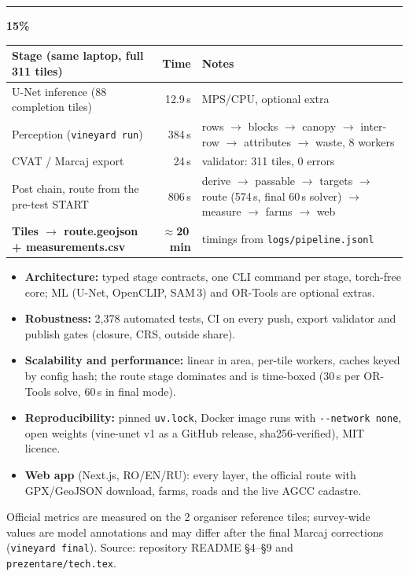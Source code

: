 \documentclass[10pt,a4paper]{article}
\newcommand{\crit}[3]{%
  \par\vspace{7pt}%
  {\color{#1}\rule[-2pt]{6pt}{12pt}}\hspace{5pt}{\large\bfseries\color{night}#2}\hfill{\bfseries\color{#1}#3}\par
  \vspace{-2pt}{\color{#1}\rule{\linewidth}{0.8pt}}\par\vspace{2pt}}
\begin{document}
\crit{cEng}{Engineering}{15\%}
{\small
\begin{tabularx}{\linewidth}{@{}l r Y@{}}
  \toprule
  \textbf{Stage (same laptop, full 311 tiles)} & \textbf{Time} & \textbf{Notes} \\
  \midrule
  U-Net inference (88 completion tiles) & 12.9\,s & MPS/CPU, optional extra \\
  Perception (\texttt{vineyard run}) & 384\,s & rows $\rightarrow$ blocks $\rightarrow$ canopy $\rightarrow$ inter-row $\rightarrow$ attributes $\rightarrow$ waste, 8 workers \\
  CVAT / Marcaj export & 24\,s & validator: 311 tiles, 0 errors \\
  Post chain, route from the pre-test START & 806\,s & derive $\rightarrow$ passable $\rightarrow$ targets $\rightarrow$ route (574\,s, final 60\,s solver) $\rightarrow$ measure $\rightarrow$ farms $\rightarrow$ web \\
  \midrule
  \textbf{Tiles $\rightarrow$ route.geojson + measurements.csv} & \textbf{$\approx$20\,min} & timings from \texttt{logs/pipeline.jsonl} \\
  \bottomrule
\end{tabularx}}
\par\vspace{3pt}
{\small
\begin{itemize}
  \item \textbf{Architecture:} typed stage contracts, one CLI command per stage, torch-free core; ML (U-Net, OpenCLIP, SAM\,3) and OR-Tools are optional extras.
  \item \textbf{Robustness:} 2,378 automated tests, CI on every push, export validator and publish gates (closure, CRS, outside share).
  \item \textbf{Scalability and performance:} linear in area, per-tile workers, caches keyed by config hash; the route stage dominates and is time-boxed (30\,s per OR-Tools solve, 60\,s in final mode).
  \item \textbf{Reproducibility:} pinned \texttt{uv.lock}, Docker image runs with \texttt{-{}-network none}, open weights (vine-unet v1 as a GitHub release, sha256-verified), MIT licence.
  \item \textbf{Web app} (Next.js, RO/EN/RU): every layer, the official route with GPX/GeoJSON download, farms, roads and the live AGCC cadastre.
\end{itemize}}

\vfill
{\scriptsize\color{muted} Official metrics are measured on the 2 organiser reference tiles; survey-wide values are model annotations and may differ
after the final Marcaj corrections (\texttt{vineyard final}). Source: repository README §4--§9 and \texttt{prezentare/tech.tex}.}
\end{document}
